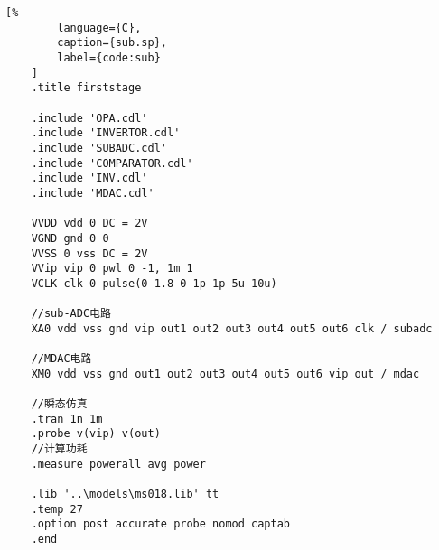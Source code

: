     \begin{lstlisting}[%
        language={C},
        caption={sub.sp},
        label={code:sub}
    ]
    .title firststage

    .include 'OPA.cdl'
    .include 'INVERTOR.cdl'
    .include 'SUBADC.cdl'
    .include 'COMPARATOR.cdl'
    .include 'INV.cdl'
    .include 'MDAC.cdl'

    VVDD vdd 0 DC = 2V
    VGND gnd 0 0
    VVSS 0 vss DC = 2V
    VVip vip 0 pwl 0 -1, 1m 1
    VCLK clk 0 pulse(0 1.8 0 1p 1p 5u 10u)

    //sub-ADC电路
    XA0 vdd vss gnd vip out1 out2 out3 out4 out5 out6 clk / subadc

    //MDAC电路
    XM0 vdd vss gnd out1 out2 out3 out4 out5 out6 vip out / mdac

    //瞬态仿真
    .tran 1n 1m
    .probe v(vip) v(out)
    //计算功耗
    .measure powerall avg power

    .lib '..\models\ms018.lib' tt
    .temp 27
    .option post accurate probe nomod captab
    .end
    \end{lstlisting}


